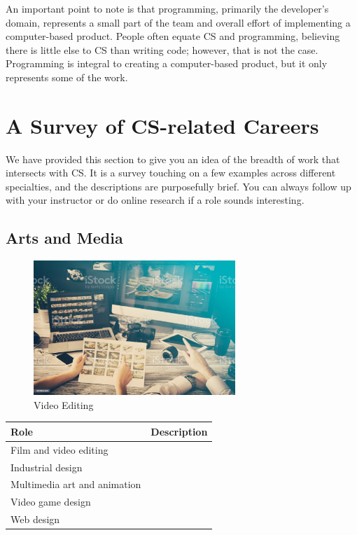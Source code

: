 An important point to note is that programming, primarily the developer's domain, represents a small part of the team and overall effort of implementing a computer-based product. People often equate CS and programming, believing there is little else to CS than writing code; however, that is not the case. Programming is integral to creating a computer-based product, but it only represents some of the work.



\section{A Survey of CS-related Careers}

We have provided this section to give you an idea of the breadth of work that intersects with CS. It is a survey touching on a few examples across different specialties, and the descriptions are purposefully brief. You can always follow up with your instructor or do online research if a role sounds interesting.

\subsection{Arts and Media}

\begin{figure}[H]
	\begin{center}
		\caption{Video Editing}
		\vskip 4pt
		\includegraphics[height=2in]{images/careers/istockphoto-922654000-1024x1024.jpg}
	\end{center}
\end{figure}

\begin{table}[H]
	\begin{center}
		\begin{tabular}{p{1.5in}|p{2.9in}} 
			\textbf{Role} & \textbf{Description}\\
			\hline
			Film and video editing & \\
			\hline
			Industrial design & \\
			\hline
			Multimedia art and animation & \\
			\hline
			Video game design & \\
			\hline
			Web design & \\
			\hline
		\end{tabular}
	\end{center}
\end{table}


